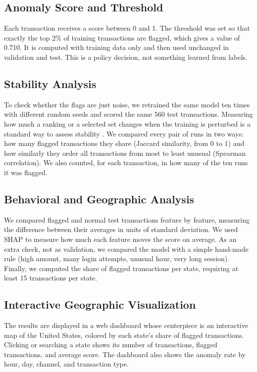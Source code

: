 \documentclass[journal]{IEEEtran}
\begin{document}
\subsection{Anomaly Score and Threshold}

Each transaction receives a score between 0 and 1. The threshold was set so that exactly the top 2\% of training transactions are flagged, which gives a value of 0.710. It is computed with training data only and then used unchanged in validation and test. This is a policy decision, not something learned from labels.

\subsection{Stability Analysis}

To check whether the flags are just noise, we retrained the same model ten times with different random seeds and scored the same 560 test transactions. Measuring how much a ranking or a selected set changes when the training is perturbed is a standard way to assess stability \cite{kalousis2007stability}. We compared every pair of runs in two ways: how many flagged transactions they share (Jaccard similarity, from 0 to 1) and how similarly they order all transactions from most to least unusual (Spearman correlation). We also counted, for each transaction, in how many of the ten runs it was flagged.

\subsection{Behavioral and Geographic Analysis}

We compared flagged and normal test transactions feature by feature, measuring the difference between their averages in units of standard deviation. We used SHAP \cite{lundberg2017unified,lundberg2020trees} to measure how much each feature moves the score on average. As an extra check, not as validation, we compared the model with a simple hand-made rule (high amount, many login attempts, unusual hour, very long session). Finally, we computed the share of flagged transactions per state, requiring at least 15 transactions per state.

\subsection{Interactive Geographic Visualization}

The results are displayed in a web dashboard whose centerpiece is an interactive map of the United States, colored by each state's share of flagged transactions. Clicking or searching a state shows its number of transactions, flagged transactions, and average score. The dashboard also shows the anomaly rate by hour, day, channel, and transaction type.
\end{document}
